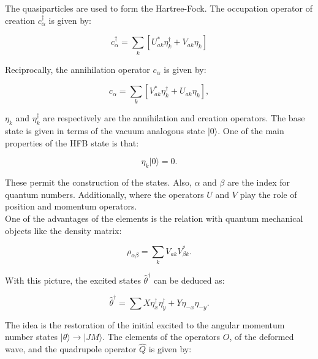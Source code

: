 \documentclass[openany]{book}
\begin{document}
The quasiparticles are used to form the Hartree-Fock. The occupation operator of creation $c^{\dagger}_\alpha$ is given by:

\begin{equation}\label{eq:micro_HFB_creation}
	c^{\dagger}_\alpha = \sum_{k} [U^{*}_{ak} \eta^{\dagger}_k + V_{ak} \eta_k]
\end{equation}

Reciprocally, the annihilation operator $c_\alpha$ is given by: 


\begin{equation}\label{eq:micro_HFB_annihilation}
	c_\alpha = \sum_{k} [V^{*}_{ak} \eta^{\dagger}_k + U_{ak} \eta_k],
\end{equation}

$\eta_k$ and  $\eta^{\dagger}_k $ are respectively are the annihilation and creation operators.  The base state is given in terms of the vacuum analogous state $| 0 \rangle$. One of the main properties of the HFB state is that: 

\begin{equation}\label{eq:micro_HFB_base}
	\eta_k |0\rangle = 0.
\end{equation} 

These permit the construction of the states. Also, $\alpha$ and $\beta$ are the index for quantum numbers. Additionally, where the operators $U$ and $V$ play the role of position and momentum operators. \\

One of the advantages of the elements is the relation with quantum mechanical objects like the density matrix: 

\begin{equation}\label{eq:micro_HFB_densityMatrix}
	\rho_{\alpha \beta} = \sum_k {V_{ak}V^{*}_{\beta k}}.
\end{equation}

With this picture, the excited states ${\hat {\theta}}^{\dagger}$ can be deduced as:

\begin{equation}\label{eq:micro_QHFB_excited}
	{\hat {\theta}}^{\dagger} = \sum X \eta^\dagger_x \eta^\dagger_y   + Y \eta_{-x} \eta_{-y}.
\end{equation}

The idea is the restoration of the initial excited to the angular momentum number states $|\theta \rangle \rightarrow | JM \rangle$. The elements of the operators $O$, of the deformed wave, and the quadrupole operator $\hat Q$ is given by: 
\end{document}
